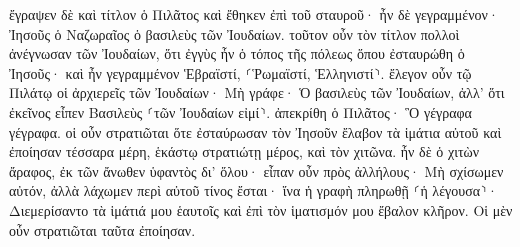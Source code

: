 \documentclass{openreader}
\begin{document}
ἔγραψεν δὲ καὶ τίτλον ὁ Πιλᾶτος καὶ ἔθηκεν ἐπὶ τοῦ σταυροῦ· ἦν δὲ γεγραμμένον· Ἰησοῦς ὁ Ναζωραῖος ὁ βασιλεὺς τῶν Ἰουδαίων. 
τοῦτον οὖν τὸν τίτλον πολλοὶ ἀνέγνωσαν τῶν Ἰουδαίων, ὅτι ἐγγὺς ἦν ὁ τόπος τῆς πόλεως ὅπου ἐσταυρώθη ὁ Ἰησοῦς· καὶ ἦν γεγραμμένον Ἑβραϊστί, ⸂Ῥωμαϊστί, Ἑλληνιστί⸃. 
ἔλεγον οὖν τῷ Πιλάτῳ οἱ ἀρχιερεῖς τῶν Ἰουδαίων· Μὴ γράφε· Ὁ βασιλεὺς τῶν Ἰουδαίων, ἀλλ’ ὅτι ἐκεῖνος εἶπεν Βασιλεὺς ⸂τῶν Ἰουδαίων εἰμί⸃. 
ἀπεκρίθη ὁ Πιλᾶτος· Ὃ γέγραφα γέγραφα. 
οἱ οὖν στρατιῶται ὅτε ἐσταύρωσαν τὸν Ἰησοῦν ἔλαβον τὰ ἱμάτια αὐτοῦ καὶ ἐποίησαν τέσσαρα μέρη, ἑκάστῳ στρατιώτῃ μέρος, καὶ τὸν χιτῶνα. ἦν δὲ ὁ χιτὼν ἄραφος, ἐκ τῶν ἄνωθεν ὑφαντὸς δι’ ὅλου· 
εἶπαν οὖν πρὸς ἀλλήλους· Μὴ σχίσωμεν αὐτόν, ἀλλὰ λάχωμεν περὶ αὐτοῦ τίνος ἔσται· ἵνα ἡ γραφὴ πληρωθῇ ⸂ἡ λέγουσα⸃· Διεμερίσαντο τὰ ἱμάτιά μου ἑαυτοῖς καὶ ἐπὶ τὸν ἱματισμόν μου ἔβαλον κλῆρον. Οἱ μὲν οὖν στρατιῶται ταῦτα ἐποίησαν. 
\end{document}
